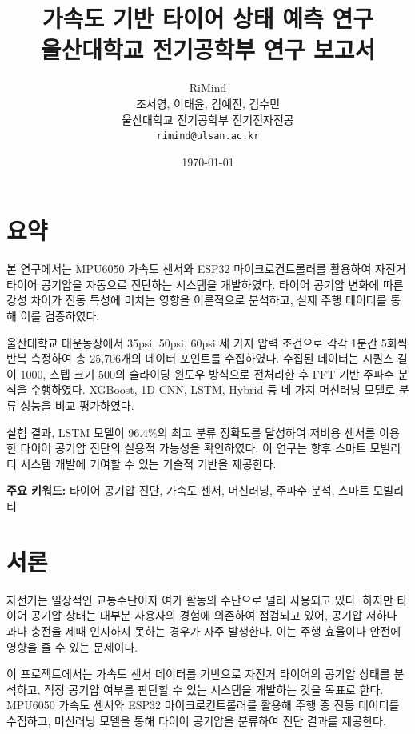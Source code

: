 \documentclass[12pt,a4paper]{article}
\title{
    \Large \textbf{가속도 기반 타이어 상태 예측 연구} \\
    \vspace{0.5cm}
    \large 울산대학교 전기공학부 연구 보고서
}
\author{
    RiMind \\
    조서영, 이태윤, 김예진, 김수민\\
    \small 울산대학교 전기공학부 전기전자전공 \\
    \small \texttt{rimind@ulsan.ac.kr}
}
\date{\today}
\begin{document}
\maketitle
\thispagestyle{empty}

\section*{요약}

본 연구에서는 MPU6050 가속도 센서와 ESP32 마이크로컨트롤러를 활용하여 자전거 타이어 공기압을 자동으로 진단하는 시스템을 개발하였다. 타이어 공기압 변화에 따른 강성 차이가 진동 특성에 미치는 영향을 이론적으로 분석하고, 실제 주행 데이터를 통해 이를 검증하였다. 

울산대학교 대운동장에서 35psi, 50psi, 60psi 세 가지 압력 조건으로 각각 1분간 5회씩 반복 측정하여 총 25,706개의 데이터 포인트를 수집하였다. 수집된 데이터는 시퀀스 길이 1000, 스텝 크기 500의 슬라이딩 윈도우 방식으로 전처리한 후 FFT 기반 주파수 분석을 수행하였다. XGBoost, 1D CNN, LSTM, Hybrid 등 네 가지 머신러닝 모델로 분류 성능을 비교 평가하였다. 

실험 결과, LSTM 모델이 96.4\%의 최고 분류 정확도를 달성하여 저비용 센서를 이용한 타이어 공기압 진단의 실용적 가능성을 확인하였다. 이 연구는 향후 스마트 모빌리티 시스템 개발에 기여할 수 있는 기술적 기반을 제공한다.

\textbf{주요 키워드:} 타이어 공기압 진단, 가속도 센서, 머신러닝, 주파수 분석, 스마트 모빌리티

\newpage

\tableofcontents
\newpage

\listoffigures

\listoftables
\newpage

\section{서론}
\label{sec:introduction}

자전거는 일상적인 교통수단이자 여가 활동의 수단으로 널리 사용되고 있다. 하지만 타이어 공기압 상태는 대부분 사용자의 경험에 의존하여 점검되고 있어, 공기압 저하나 과다 충전을 제때 인지하지 못하는 경우가 자주 발생한다. 이는 주행 효율이나 안전에 영향을 줄 수 있는 문제이다.

이 프로젝트에서는 가속도 센서 데이터를 기반으로 자전거 타이어의 공기압 상태를 분석하고, 적정 공기압 여부를 판단할 수 있는 시스템을 개발하는 것을 목표로 한다. MPU6050 가속도 센서와 ESP32 마이크로컨트롤러를 활용해 주행 중 진동 데이터를 수집하고, 머신러닝 모델을 통해 타이어 공기압을 분류하여 진단 결과를 제공한다.
\end{document}
